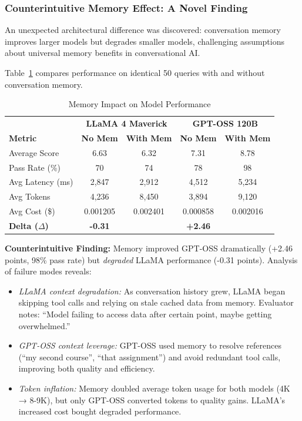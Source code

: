 \documentclass{article}
\begin{document}
\subsubsection{Counterintuitive Memory Effect: A Novel Finding}

An unexpected architectural difference was discovered: conversation memory improves larger models but degrades smaller models, challenging assumptions about universal memory benefits in conversational AI.

Table~\ref{tab:memory_impact} compares performance on identical 50 queries with and without conversation memory.

\begin{table}[h]
\centering
\caption{Memory Impact on Model Performance}
\label{tab:memory_impact}
\begin{tabular}{lcccc}
\toprule
 & \multicolumn{2}{c}{\textbf{LLaMA 4 Maverick}} & \multicolumn{2}{c}{\textbf{GPT-OSS 120B}} \\
\textbf{Metric} & \textbf{No Mem} & \textbf{With Mem} & \textbf{No Mem} & \textbf{With Mem} \\
\midrule
Average Score & 6.63 & 6.32 & 7.31 & 8.78 \\
Pass Rate (\%) & 70 & 74 & 78 & 98 \\
\midrule
Avg Latency (ms) & 2,847 & 2,912 & 4,512 & 5,234 \\
Avg Tokens & 4,236 & 8,450 & 3,894 & 9,120 \\
Avg Cost (\$) & 0.001205 & 0.002401 & 0.000858 & 0.002016 \\
\midrule
\textbf{Delta ($\Delta$)} & \textbf{-0.31} & & \textbf{+2.46} & \\
\bottomrule
\end{tabular}
\end{table}

\textbf{Counterintuitive Finding:} Memory improved GPT-OSS dramatically (+2.46 points, 98\% pass rate) but \textit{degraded} LLaMA performance (-0.31 points). Analysis of failure modes reveals:

\begin{itemize}
    \item \textit{LLaMA context degradation:} As conversation history grew, LLaMA began skipping tool calls and relying on stale cached data from memory. Evaluator notes: ``Model failing to access data after certain point, maybe getting overwhelmed.''
    
    \item \textit{GPT-OSS context leverage:} GPT-OSS used memory to resolve references (``my second course'', ``that assignment'') and avoid redundant tool calls, improving both quality and efficiency.
    
    \item \textit{Token inflation:} Memory doubled average token usage for both models (4K → 8-9K), but only GPT-OSS converted tokens to quality gains. LLaMA's increased cost bought degraded performance.
\end{itemize}
\end{document}
